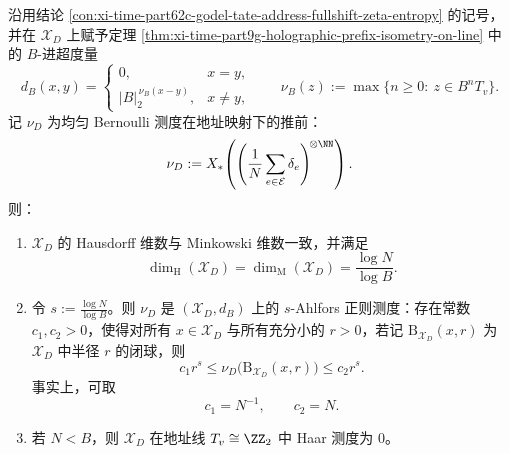 \begin{conclusion}\label{con:xi-time-part62c-godel-tate-address-ahlfors-regularity}
沿用结论 \ref{con:xi-time-part62c-godel-tate-address-fullshift-zeta-entropy} 的记号，并在 \(\mathcal X_D\) 上赋予定理 \ref{thm:xi-time-part9g-holographic-prefix-isometry-on-line} 中的 \(B\)-进超度量
\[
d_B(x,y)=
\begin{cases}
0,& x=y,\\[2pt]
|B|_2^{\,\nu_B(x-y)},& x\neq y,
\end{cases}
\qquad
\nu_B(z):=\max\{n\ge 0:\ z\in B^nT_v\}.
\]
记 \(\nu_D\) 为均匀 Bernoulli 测度在地址映射下的推前：
\[
\nu_D
:=
X_*\!\left(
\left(\frac1N\sum_{e\in \mathcal E}\delta_e\right)^{\!\otimes\NN}
\right).
\]
则：
\begin{enumerate}
  \item \(\mathcal X_D\) 的 Hausdorff 维数与 Minkowski 维数一致，并满足
  \[
  \dim_{\mathrm H}(\mathcal X_D)
  =
  \dim_{\mathrm M}(\mathcal X_D)
  =
  \frac{\log N}{\log B}.
  \]
  \item 令 \(s:=\frac{\log N}{\log B}\)。则 \(\nu_D\) 是 \((\mathcal X_D,d_B)\) 上的 \(s\)-Ahlfors 正则测度：存在常数 \(c_1,c_2>0\)，使得对所有 \(x\in\mathcal X_D\) 与所有充分小的 \(r>0\)，若记 \(\mathrm B_{\mathcal X_D}(x,r)\) 为 \(\mathcal X_D\) 中半径 \(r\) 的闭球，则
  \[
  c_1r^s\le \nu_D\bigl(\mathrm B_{\mathcal X_D}(x,r)\bigr)\le c_2r^s.
  \]
  事实上，可取
  \[
  c_1=N^{-1},
  \qquad
  c_2=N.
  \]
  \item 若 \(N<B\)，则 \(\mathcal X_D\) 在地址线 \(T_v\cong\ZZ_2\) 中 Haar 测度为 \(0\)。
\end{enumerate}
\end{conclusion}
